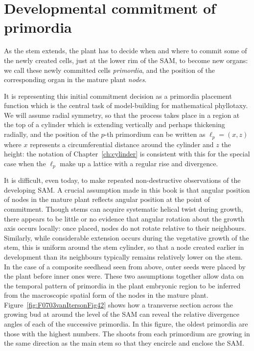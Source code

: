 \section{Developmental commitment of primordia}


As the stem extends, the plant has to decide when and where to commit some of the newly created cells, just at the lower rim of the SAM, to become new organs: we call these newly committed cells \textit{primordia}, and the position of the corresponding organ in the mature plant \textit{nodes}. 

It is representing this initial commitment decision as a primordia placement function which is the central task of model-building for mathematical phyllotaxy. We will assume radial symmetry, so that the process takes place in a region at the top of a cylinder which is extending vertically and perhaps thickening radially, and the position of the $p$-th primordium can be written as $\ell_p=(x,z)$ where $x$ represents a circumferential distance around the cylinder and $z$ the height: the notation of Chapter~\ref{ch:cylinder} is consistent with this for the special case when the $\ell_p$ make up a lattice with a regular rise and divergence. 

It is difficult, even today, to make repeated non-destructive observations of the developing SAM. A crucial assumption made in this book is that angular position of nodes in the mature plant reflects angular position at the point of commitment. Though stems can acquire systematic helical twist during growth, there appears to be little or no evidence that angular rotation about the growth axis occurs locally: once placed,  nodes do not rotate relative to their neighbours. Similarly, while considerable  extension occurs during the vegetative growth of the stem, this is uniform around the stem cylinder, so that a node created earlier in development than its neighbours typically remains relatively lower on the stem.  In the case of a composite seedhead seen from above, outer seeds were placed by the plant before inner ones were. 
These two assumptions together allow data on the temporal pattern of primordia in the plant embryonic region to be inferred from the macroscopic spatial form of the nodes in the mature plant.
Figure~\ref{fig:F0703vanItersonFig42} shows how a transverse section across the growing bud at around the level of the SAM can reveal the relative divergence angles of each of the successive primordia. In this figure, the oldest primordia are those with the highest numbers. The shoots from each primordium are growing in the same direction as the main stem so that they encircle and enclose the SAM. 
 
